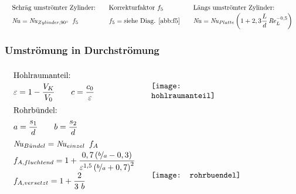 	\skipabove{-10pt}
	\[ \arraycolsep=1em  \def\arraystretch{1.5}
	\begin{array}{lll}
		\text{Schräg umströmter Zylinder:}      & \text{Korrekturfaktor } f_5           & \text{Längs umströmter Zylinder:}                                        \\
		\Nuss = \Nuss_{Zylinder,\ang{90}} \ f_5 & f_5 = \text{siehe Diag. \ref{abb:f5}} & \Nuss =  \Nuss_{Platte}  \left(1+ 2,3 \dfrac{L}{d} \Reyn_L^{-0,5}\right)
	\end{array}\]

\subsubsection{Umströmung in Durchströmung} \label{sec:um-in-durch}
		\skipabove{-20pt}
		\[ \arraycolsep=1em  \def\arraystretch{1.7}
		\begin{array}{ll}
			\text{Hohlraumanteil:}                                                                                                  & \multirow{3}{0.24\textwidth}{\texttt{[image: hohlraumanteil]}} \\
			\varepsilon = 1- \dfrac{V_K}{V_0}  \qquad  c = \dfrac{c_0}{\varepsilon}                                                 &                                                                                  \\
			\text{Rohrbündel:}                                                                                                      & \multirow{9}{0.5\textwidth}{\texttt{[image: rohrbuendel]}}     \\
			a = \dfrac{s_1}{d}  \qquad  b = \dfrac{s_2}{d}                                                                          &                                                                                  \\
			\Nuss_{B\ue ndel} = \Nuss_{einzel}\ f_A                                                                                 &                                                                                  \\
			f_{A,fluchtend} = 1+ \dfrac{0,7 \left(\nicefrac{b}{a}-0,3\right)}{\varepsilon^{1,5} \left(\nicefrac{b}{a}+0,7\right)^2} &                                                                                  \\
			f_{A,versetzt} = 1 + \dfrac{2}{3\ b}                                                                                    &                                                                                  \\

\end{array}\]
